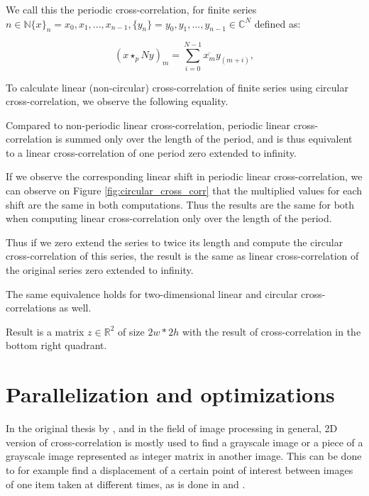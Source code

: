 We call this the periodic cross-correlation, for finite series $n \in \mathbb{N} \{x\}_n = x_0, x_1, ..., x_{n-1}, \{y_n\} = y_0, y_1, ..., y_{n-1} \in \mathbb{C}^N$ defined as:

\[
(x \star_pN y)_m = \sum_{i=0}^{N-1} \overline{x_m} y_{(m + i)},
\]


To calculate linear (non-circular) cross-correlation of finite series using circular cross-correlation, we observe the following equality.



Compared to non-periodic linear cross-correlation, periodic linear cross-correlation is summed only over the length of the period, and is thus equivalent to a linear cross-correlation of one period zero extended to infinity.

If we observe the corresponding linear shift in periodic linear cross-correlation, we can observe on Figure \ref{fig:circular_cross_corr} that the multiplied values for each shift are the same in both computations. Thus the results are the same for both when computing linear cross-correlation only over the length of the period.

Thus if we zero extend the series to twice its length and compute the circular cross-correlation of this series, the result is the same as linear cross-correlation of the original series zero extended to infinity.


The same equivalence holds for two-dimensional linear and circular cross-correlations as well. 


Result is a matrix $z \in \mathbb{R}^2$ of size $2w*2h$ with the result of cross-correlation in the bottom right quadrant.

\section{Parallelization and optimizations}
In the original thesis by \citep{misko}, and in the field of image processing in general, 2D version of cross-correlation is mostly used to find a grayscale image or a piece of a grayscale image represented as integer matrix in another image. This can be done to for example find a displacement of a certain point of interest between images of one item taken at different times, as is done in \citet{misko} and \citet{zhang2015}. 

